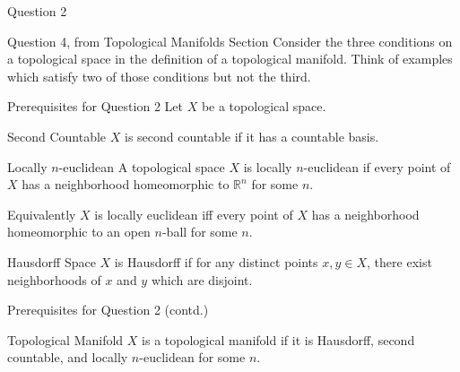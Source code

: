 \documentclass{beamer}
\begin{document}
\begin{frame}{Question 2}
\begin{block}{Question 4, from Topological Manifolds Section}
Consider the three conditions on a topological space in the definition of a topological manifold. Think of examples which satisfy two of those conditions
but not the third.
\end{block}
\end{frame}

\begin{frame}{Prerequisites for Question 2}
Let $X$ be a topological space.
\begin{block}{Second Countable}
$\displaystyle X$ is \alert{second countable} if it has a countable basis. 
\end{block}
\begin{block}{Locally $n$-euclidean}
A topological space $\displaystyle X$ is \alert{locally $n$-euclidean} if every point of $\displaystyle X$ has a neighborhood homeomorphic to $\displaystyle \mathbb{R}^{n}$ for some $\displaystyle n$.


Equivalently $\displaystyle X$ is locally
euclidean iff every point of $\displaystyle X$ has a neighborhood homeomorphic to an open $\displaystyle n$-ball for some $\displaystyle n$.


\end{block}
\begin{block}{Hausdorff Space}
$\displaystyle X$ is \alert{Hausdorff} if for any distinct points $\displaystyle x,y\in X$, there exist neighborhoods of $\displaystyle x$ and $\displaystyle y$ which are disjoint.
\end{block}
\end{frame}
\begin{frame}{Prerequisites for Question 2 (contd.)}
\begin{block}{Topological Manifold}
$\displaystyle X$ is a topological manifold if it is Hausdorff, second countable, and locally $\displaystyle n$-euclidean for some $\displaystyle n$.
\end{block}
\end{frame}
\end{document}
